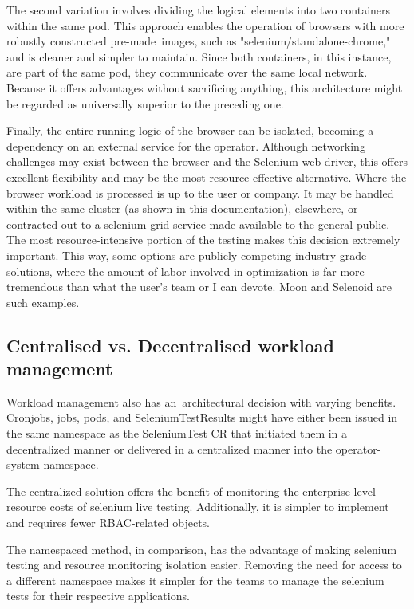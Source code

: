 The second variation involves dividing the logical elements into two containers within the same pod. This approach enables the operation of browsers with more robustly constructed pre-made images, such as "selenium/standalone-chrome," and is cleaner and simpler to maintain. Since both containers, in this instance, are part of the same pod, they communicate over the same local network. Because it offers advantages without sacrificing anything, this architecture might be regarded as universally superior to the preceding one.

Finally, the entire running logic of the browser can be isolated, becoming a dependency on an external service for the operator. Although networking challenges may exist between the browser and the Selenium web driver, this offers excellent flexibility and may be the most resource-effective alternative. Where the browser workload is processed is up to the user or company. It may be handled within the same cluster (as shown in this documentation), elsewhere, or contracted out to a selenium grid service made available to the general public. The most resource-intensive portion of the testing makes this decision extremely important. This way, some options are publicly competing industry-grade solutions, where the amount of labor involved in optimization is far more tremendous than what the user's team or I can devote. Moon and Selenoid are such examples.

\subsection{Centralised vs. Decentralised workload management}

Workload management also has an architectural decision with varying benefits. Cronjobs, jobs, pods, and SeleniumTestResults might have either been issued in the same namespace as the SeleniumTest CR that initiated them in a decentralized manner or delivered in a centralized manner into the operator-system namespace. 

The centralized solution offers the benefit of monitoring the enterprise-level resource costs of selenium live testing. Additionally, it is simpler to implement and requires fewer RBAC-related objects.

The namespaced method, in comparison, has the advantage of making selenium testing and resource monitoring isolation easier. Removing the need for access to a different namespace makes it simpler for the teams to manage the selenium tests for their respective applications.

